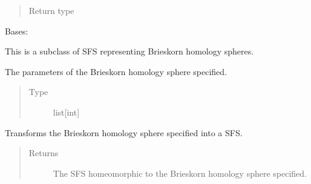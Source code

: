 \documentclass[letterpaper,10pt,english]{sphinxmanual}
\begin{document}
\begin{fulllineitems}
\begin{fulllineitems}
\begin{quote}
\begin{description}
\item[{Return type}] \leavevmode
\sphinxAtStartPar
{\hyperref[\detokenize{soapy:soapy.SFS}]{}}

\end{description}\end{quote}

\end{fulllineitems}


\end{fulllineitems}


\begin{fulllineitems}
\label{\detokenize{soapy:soapy.Brieskorn}}
\sphinxAtStartPar
Bases: {\hyperref[\detokenize{soapy:soapy.SFS}]{}}

\sphinxAtStartPar
This is a subclass of SFS representing Brieskorn homology spheres.

\begin{fulllineitems}
\label{\detokenize{soapy:soapy.Brieskorn.params}}
\sphinxAtStartPar
The parameters of the Brieskorn homology sphere specified.
\begin{quote}\begin{description}
\item[{Type}] \leavevmode
\sphinxAtStartPar
list{[}int{]}

\end{description}\end{quote}

\end{fulllineitems}


\begin{fulllineitems}
\label{\detokenize{soapy:soapy.Brieskorn.to_SFS}}
\sphinxAtStartPar
Transforms the Brieskorn homology sphere specified into a SFS.
\begin{quote}\begin{description}
\item[{Returns}] \leavevmode
\sphinxAtStartPar
The SFS homeomorphic to the Brieskorn homology sphere specified.


\end{description}
\end{quote}
\end{fulllineitems}
\end{fulllineitems}
\end{document}
